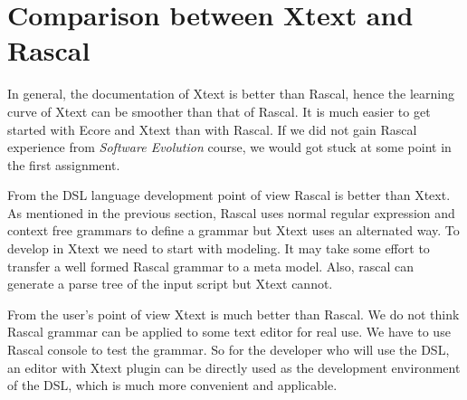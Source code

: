 \documentclass[a4paper, 11pt]{article}
\begin{document}
\section{Comparison between Xtext and Rascal}

In general, the documentation of Xtext is better than Rascal, hence the learning curve of Xtext can be smoother than that of Rascal. It is much easier to get started with Ecore and Xtext than with Rascal. If we did not gain Rascal experience from \textit{Software Evolution} course, we would got stuck at some point in the first assignment. \bigbreak

From the DSL language development point of view Rascal is better than Xtext. As mentioned in the previous section, Rascal uses normal regular expression and context free grammars to define a grammar but Xtext uses an alternated way. To develop in Xtext we need to start with modeling. It may take some effort to transfer a well formed Rascal grammar to a meta model. Also, rascal can generate a parse tree of the input script but Xtext cannot. 

From the user's point of view Xtext is much better than Rascal. We do not think Rascal grammar can be applied to some text editor for real use. We have to use Rascal console to test the grammar. So for the developer who will use the DSL, an editor with Xtext plugin can be directly used as the development environment of the DSL, which is much more convenient and applicable. 
\end{document}
